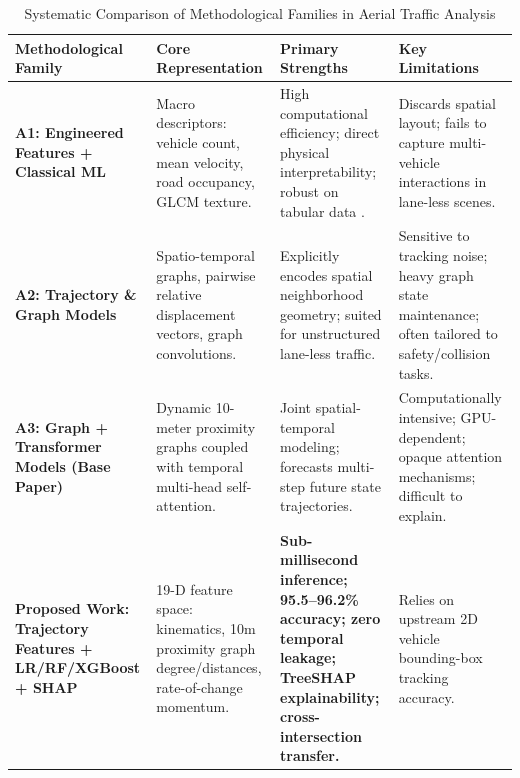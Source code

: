 \documentclass[conference]{IEEEtran}
\begin{document}
\begin{table}[t]
\caption{Systematic Comparison of Methodological Families in Aerial Traffic Analysis}
\label{tab:literature_comparison}
\centering
\begin{tabular}{p{3.2cm}p{4.2cm}p{4.5cm}p{4.2cm}}
\toprule
\textbf{Methodological Family} & \textbf{Core Representation} & \textbf{Primary Strengths} & \textbf{Key Limitations} \\
\midrule
\textbf{A1: Engineered Features + Classical ML} \cite{impedovo2019vehicular, breiman2001random, chen2016xgboost, grinsztajn2022tree} & Macro descriptors: vehicle count, mean velocity, road occupancy, GLCM texture. & High computational efficiency; direct physical interpretability; robust on tabular data \cite{grinsztajn2022tree}. & Discards spatial layout; fails to capture multi-vehicle interactions in lane-less scenes. \\
\midrule
\textbf{A2: Trajectory \& Graph Models} \cite{roy2020defining, roy2022detection, yu2018spatio, li2018diffusion, jiang2022graph} & Spatio-temporal graphs, pairwise relative displacement vectors, graph convolutions. & Explicitly encodes spatial neighborhood geometry; suited for unstructured lane-less traffic. & Sensitive to tracking noise; heavy graph state maintenance; often tailored to safety/collision tasks. \\
\midrule
\textbf{A3: Graph + Transformer Models (Base Paper)} \cite{kumar2024tsanet, vaswani2017attention} & Dynamic 10-meter proximity graphs coupled with temporal multi-head self-attention. & Joint spatial-temporal modeling; forecasts multi-step future state trajectories. & Computationally intensive; GPU-dependent; opaque attention mechanisms; difficult to explain. \\
\midrule
\textbf{Proposed Work: Trajectory Features + LR/RF/XGBoost + SHAP} & 19-D feature space: kinematics, 10m proximity graph degree/distances, rate-of-change momentum. & \textbf{Sub-millisecond inference; 95.5--96.2\% accuracy; zero temporal leakage; TreeSHAP explainability; cross-intersection transfer.} & Relies on upstream 2D vehicle bounding-box tracking accuracy. \\
\bottomrule
\end{tabular}
\end{table}
\end{document}
